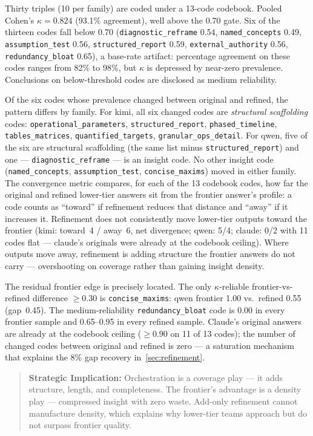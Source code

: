 \documentclass[12pt,a4paper]{article}
\begin{document}
Thirty triples (10 per family) are coded under a 13-code codebook. Pooled
Cohen's $\kappa = 0.824$ (93.1\% agreement), well above the 0.70 gate. Six of
the thirteen codes fall below 0.70 (\texttt{diagnostic\_reframe} 0.54,
\texttt{named\_concepts} 0.49, \texttt{assumption\_test} 0.56,
\texttt{structured\_report} 0.59, \texttt{external\_authority} 0.56,
\texttt{redundancy\_bloat} 0.65), a base-rate artifact: percentage agreement on
these codes ranges from 82\% to 98\%, but $\kappa$ is depressed by near-zero
prevalence. Conclusions on below-threshold codes are disclosed as medium
reliability.

Of the six codes whose prevalence changed between original and refined, the
pattern differs by family. For kimi, all six changed codes are
\emph{structural scaffolding} codes: \texttt{operational\_parameters},
\texttt{structured\_report}, \texttt{phased\_timeline},
\texttt{tables\_matrices}, \texttt{quantified\_targets},
\texttt{granular\_ops\_detail}. For qwen, five of the six are structural
scaffolding (the same list minus \texttt{structured\_report}) and one ---
\texttt{diagnostic\_reframe} --- is an insight code. No other insight code
(\texttt{named\_concepts}, \texttt{assumption\_test},
\texttt{concise\_maxims}) moved in either family. The convergence metric compares, for each of the 13 codebook codes, how far
the original and refined lower-tier answers sit from the frontier answer's
profile: a code counts as ``toward'' if refinement reduces that distance and
``away'' if it increases it. Refinement does not consistently move lower-tier
outputs toward the frontier (kimi: toward~4 / away~6, net divergence; qwen:
5/4; claude: 0/2 with 11 codes flat --- claude's originals were already at the
codebook ceiling). Where outputs move away, refinement is adding structure the
frontier answers do not carry --- overshooting on coverage rather than gaining
insight density.

The residual frontier edge is precisely located. The only $\kappa$-reliable
frontier-vs-refined difference $\ge 0.30$ is \texttt{concise\_maxims}: qwen
frontier 1.00 vs.\ refined 0.55 (gap~0.45). The medium-reliability
\texttt{redundancy\_bloat} code is 0.00 in every frontier sample and 0.65--0.95
in every refined sample. Claude's original answers are already at the codebook
ceiling ($\ge 0.90$ on 11 of 13 codes); the number of changed codes between
original and refined is zero --- a saturation mechanism that explains the 8\%
gap recovery in~\cref{sec:refinement}.

\begin{quote}
\textbf{Strategic Implication:} Orchestration is a coverage play --- it adds
structure, length, and completeness. The frontier's advantage is a density
play --- compressed insight with zero waste. Add-only refinement cannot
manufacture density, which explains why lower-tier teams approach but do not surpass
frontier quality.
\end{quote}
\end{document}
